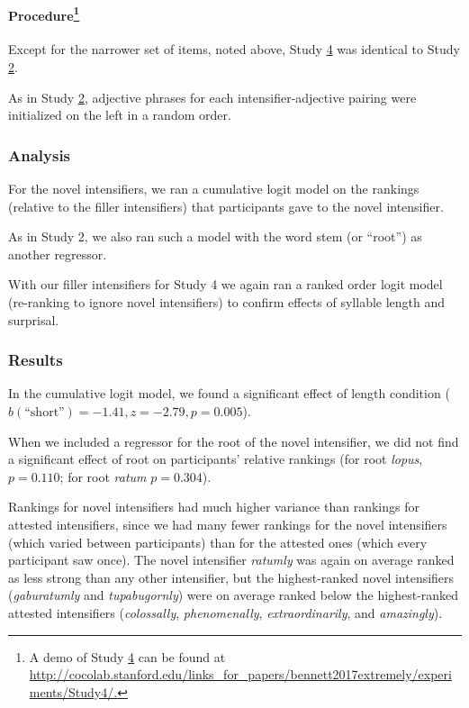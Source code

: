 \documentclass[10pt,letterpaper]{article}
\newcommand{\w}[1]{\emph{#1}}
\begin{document}
\paragraph{Procedure\footnote{A demo of Study \hyperref[sec:study4]{4} can be found at \url{http://cocolab.stanford.edu/links_for_papers/bennett2017extremely/experiments/Study4/.}}}

Except for the narrower set of items, noted above, Study \hyperref[sec:study4]{4} was identical to Study \hyperref[sec:study2]{2}. 

As in Study \hyperref[sec:study2]{2}, adjective phrases for each intensifier-adjective pairing were initialized on the left in a random order.

\subsubsection{Analysis}

For the novel intensifiers, we ran a cumulative logit model on the rankings (relative to the filler intensifiers) that participants gave to the novel intensifier.

As in Study 2, we also ran such a model with the word stem (or ``root'') as another regressor.

With our filler intensifiers for Study 4 we again ran a ranked order logit model (re-ranking to ignore novel intensifiers) to confirm effects of syllable length and surprisal.

\subsubsection{Results}

In the cumulative logit model, we found a significant effect of length condition ($b(\mbox{``short''})=-1.41, z=-2.79, p=0.005$).

When we included a regressor for the root of the novel intensifier, we did not find a significant effect of root on participants' relative rankings (for root \w{lopus}, $p=0.110$; for root \w{ratum} $p=0.304$).

Rankings for novel intensifiers had much higher variance than rankings for attested intensifiers, since we had many fewer rankings for the novel intensifiers (which varied between participants) than for the attested ones (which every participant saw once). The novel intensifier \w{ratumly} was again on average ranked as less strong than any other intensifier, but the highest-ranked novel intensifiers (\w{gaburatumly} and \w{tupabugornly}) were on average ranked below the highest-ranked attested intensifiers (\w{colossally}, \w{phenomenally}, \w{extraordinarily}, and \w{amazingly}).
\end{document}
